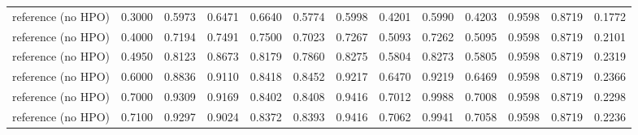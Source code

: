 \begin{tabular}{lrrrrrrrrrrrr}
reference (no HPO) &  0.3000 &  0.5973 &   0.6471 &          0.6640 &         0.5774 &   0.5998 &  0.4201 &          0.5990 &         0.4203 &      0.9598 &             0.8719 &               0.1772 \\
reference (no HPO) &  0.4000 &  0.7194 &   0.7491 &          0.7500 &         0.7023 &   0.7267 &  0.5093 &          0.7262 &         0.5095 &      0.9598 &             0.8719 &               0.2101 \\
reference (no HPO) &  0.4950 &  0.8123 &   0.8673 &          0.8179 &         0.7860 &   0.8275 &  0.5804 &          0.8273 &         0.5805 &      0.9598 &             0.8719 &               0.2319 \\
reference (no HPO) &  0.6000 &  0.8836 &   0.9110 &          0.8418 &         0.8452 &   0.9217 &  0.6470 &          0.9219 &         0.6469 &      0.9598 &             0.8719 &               0.2366 \\
reference (no HPO) &  0.7000 &  0.9309 &   0.9169 &          0.8402 &         0.8408 &   0.9416 &  0.7012 &          0.9988 &         0.7008 &      0.9598 &             0.8719 &               0.2298 \\
reference (no HPO) &  0.7100 &  0.9297 &   0.9024 &          0.8372 &         0.8393 &   0.9416 &  0.7062 &          0.9941 &         0.7058 &      0.9598 &             0.8719 &               0.2236 \\
\bottomrule
\end{tabular}
